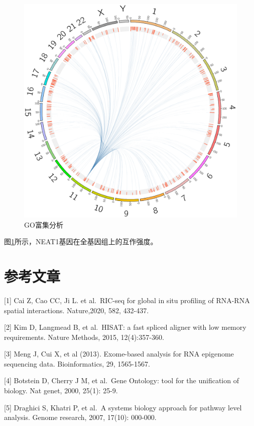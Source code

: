 \documentclass[
]{ctexart}
\begin{document}
\begin{figure}[H]

{\centering \includegraphics[width=1\linewidth]{./1.picture/NEAT1} 

}

\caption{GO富集分析}\label{fig:cir1}
\end{figure}

图\ref{fig:cir1}所示，NEAT1基因在全基因组上的互作强度。

\newpage

\hypertarget{ux53c2ux8003ux6587ux7ae0}{%
\section{参考文章}\label{ux53c2ux8003ux6587ux7ae0}}

{[}1{]} Cai Z, Cao CC, Ji L. et al.~RIC-seq for global in situ profiling of RNA-RNA spatial interactions. Nature,2020, 582, 432-437.

{[}2{]} Kim D, Langmead B, et al.~HISAT: a fast spliced aligner with low memory requirements. Nature Methods, 2015, 12(4):357-360.

{[}3{]} Meng J, Cui X, et al (2013). Exome-based analysis for RNA epigenome sequencing data. Bioinformatics, 29, 1565-1567.

{[}4{]} Botstein D, Cherry J M, et al.~Gene Ontology: tool for the unification of biology. Nat genet, 2000, 25(1): 25-9.

{[}5{]} Draghici S, Khatri P, et al.~A systems biology approach for pathway level analysis. Genome research, 2007, 17(10): 000-000.
\end{document}
